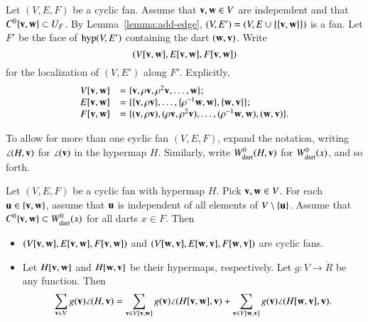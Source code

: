 \begin{definition}[slice] Let $(V,E,F)$ be a cyclic fan.  Assume that $\v,\w\in V$ are
independent and that $C^0\{\v,\w\}\subset U_F$.  By Lemma~\ref{lemma:add-edge},
$(V,E')=(V,E\cup \{\{\v,\w\}\})$ is a fan.  Let $F'$ be the face of $\op{hyp}(V,E')$ 
containing the dart $(\w,\v)$.  Write
$$(V[\v,\w],E[\v,\w],F[\v,\w])$$
for the localization of $(V,E')$ along $F'$.  Explicitly,
$$
\begin{array}{lll}
V[\v,\w] &= \{\v,\rho \v,\rho^2 \v,\ldots,\w\};\\
E[\v,\w] &= \{\{\v,\rho \v\},\ldots,\{\rho^{-1}\w,\w\},\{\w,\v\}\};\\
F[\v,\w] &= \{(\v,\rho \v),(\rho \v,\rho^2 \v),\ldots,(\rho^{-1}\w,\w),(\w,\v)\}.
\end{array}
$$
\end{definition}
%

To allow for more than one cyclic fan $(V,E,F)$,  expand the notation, writing $\angle(H,\v)$ for $\angle(\v)$ in the hypermap $H$.  Similarly, write $\Wdart(H,\v)$ for $\Wdart(x)$, and so forth.
%
%


\begin{lemma}[slicing]\label{lemma:slice}  Let $(V,E,F)$ be a cyclic fan with hypermap $H$.  Pick $\v,\w\in V$. For each $\u\in \{\v,\w\}$, assume that $\u$ is independent of all elements of $V\setminus\{\u\}$.    Assume that $C^0\{\v,\w\}\subset \Wdart(x)$ for all darts $x\in F$.  Then
\begin{itemize}
\item $(V[\v,\w],E[\v,\w],F[\v,\w])$ and $(V[\w,\v],E[\w,\v],F[\w,\v])$ are cyclic fans.  
\item Let $H[\v,\w]$ and $H[\w,\v]$ be their hypermaps, respectively.  Let $g:V\to\ring{R}$ be any function.  Then
$$
\sum_{\v\in V} g(\v)\angle(H,\v) = \sum_{\v\in V[\v,\w]}g(\v)\angle(H[\v,\w],\v) + \sum_{\v\in V[\w,\v]}g(\v)\angle(H[\w,\v],\v).
$$
\end{itemize}
\end{lemma}
%
%

